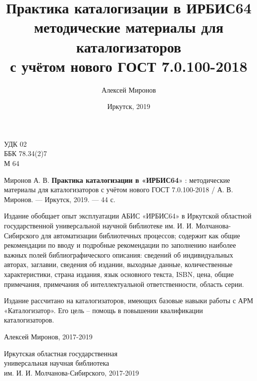 \documentclass[a5paper,10pt]{book}
\begin{document}
\author{Алексей Миронов}
\title{Практика каталогизации в ИРБИС64 \\
	{\normalsize методические материалы для каталогизаторов \\
		с учётом нового ГОСТ 7.0.100-2018
	}
}
\date{Иркутск, 2019}

\frontmatter
\maketitle

\clearpage
\thispagestyle{empty}
\noindent УДК 02 \\
ББК 78.34(2)7 \\
М 64

\vspace{8mm}

Миронов А. В. \textbf{Практика каталогизации в «ИРБИС64}» : методические материалы для каталогизаторов с учётом нового ГОСТ 7.0.100-2018 / А. В. Миронов. — Иркутск, 2019. — 44 с.

\vspace{8mm}

Издание обобщает опыт эксплуатации АБИС «ИРБИС64» в Иркутской областной государственной универсальной научной библиотеке им. И. И. Мол\-ча\-но\-ва-Сибирского для автоматизации библиотечных процессов; содержит как общие рекомендации по вводу и подробные рекомендации по заполнению наиболее важных полей библиографического описания: сведений об индивидуальных авторах, заглавии, сведения об издании, выходные данные, количественные характеристики, страна издания, язык основного текста, ISBN, цена, общие примечания, примечания об интеллектуальной ответственности, область серии.

Издание рассчитано на каталогизаторов, имеющих базовые навыки работы с АРМ «Каталогизатор». Его цель – помощь в повышении квалификации каталогизаторов.

\vspace{4cm}

\begin{flushright}
\textcopyright Алексей Миронов, 2017-2019

\vspace{3mm}	

Иркутская областная государственная \\
универсальная научная библиотека \\
им. И. И. Молчанова-Сибирского, 2017-2019
\end{flushright}

\mainmatter














\backmatter
\end{document}
